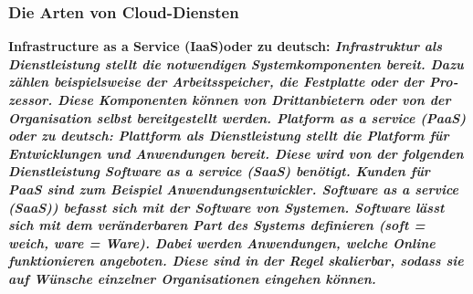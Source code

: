 \begin{otherlanguage}{ngerman}
\subsubsection{Die Arten von Cloud-Diensten}
\bf Infrastructure as a Service (IaaS)\rm oder zu deutsch: \it Infrastruktur als Dienstleistung \rm stellt die notwendigen Systemkomponenten bereit. Dazu zählen beispielsweise der Arbeitsspeicher, die Festplatte oder der Prozessor. Diese Komponenten können von Drittanbietern oder von der Organisation selbst bereitgestellt werden. 
\newline 
\bf Platform as a service (PaaS) \rm  oder zu deutsch: \it Plattform als Dienstleistung \rm stellt die Platform für Entwicklungen und Anwendungen bereit. Diese wird von der folgenden Dienstleistung \it Software as a service (SaaS) \rm benötigt. Kunden für PaaS sind zum Beispiel Anwendungsentwickler. 
\newline 
\bf Software as a service (SaaS)) \rm befasst sich mit der Software von Systemen. Software lässt sich mit dem veränderbaren Part des Systems definieren (soft = weich, ware = Ware). Dabei werden Anwendungen, welche Online funktionieren angeboten. Diese sind in der Regel skalierbar, sodass sie auf Wünsche einzelner Organisationen eingehen können.
\end{otherlanguage}